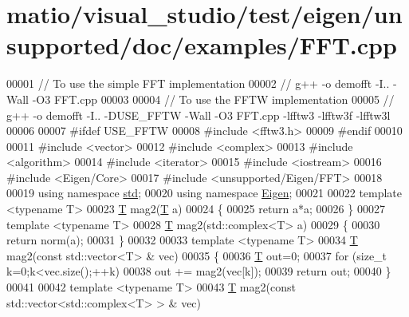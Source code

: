 \hypertarget{matio_2visual__studio_2test_2eigen_2unsupported_2doc_2examples_2_f_f_t_8cpp_source}{}\section{matio/visual\+\_\+studio/test/eigen/unsupported/doc/examples/\+F\+FT.cpp}
\label{matio_2visual__studio_2test_2eigen_2unsupported_2doc_2examples_2_f_f_t_8cpp_source}

\begin{DoxyCode}
00001 \textcolor{comment}{//  To use the simple FFT implementation}
00002 \textcolor{comment}{//  g++ -o demofft -I.. -Wall -O3 FFT.cpp }
00003 
00004 \textcolor{comment}{//  To use the FFTW implementation}
00005 \textcolor{comment}{//  g++ -o demofft -I.. -DUSE\_FFTW -Wall -O3 FFT.cpp -lfftw3 -lfftw3f -lfftw3l}
00006 
00007 \textcolor{preprocessor}{#ifdef USE\_FFTW}
00008 \textcolor{preprocessor}{#include <fftw3.h>}
00009 \textcolor{preprocessor}{#endif}
00010 
00011 \textcolor{preprocessor}{#include <vector>}
00012 \textcolor{preprocessor}{#include <complex>}
00013 \textcolor{preprocessor}{#include <algorithm>}
00014 \textcolor{preprocessor}{#include <iterator>}
00015 \textcolor{preprocessor}{#include <iostream>}
00016 \textcolor{preprocessor}{#include <Eigen/Core>}
00017 \textcolor{preprocessor}{#include <unsupported/Eigen/FFT>}
00018 
00019 \textcolor{keyword}{using namespace }\hyperlink{namespacestd}{std};
00020 \textcolor{keyword}{using namespace }\hyperlink{namespace_eigen}{Eigen};
00021 
00022 \textcolor{keyword}{template} <\textcolor{keyword}{typename} T>
00023 \hyperlink{group___sparse_core___module}{T} mag2(\hyperlink{group___sparse_core___module}{T} a)
00024 \{
00025     \textcolor{keywordflow}{return} a*a;
00026 \}
00027 \textcolor{keyword}{template} <\textcolor{keyword}{typename} T>
00028 \hyperlink{group___sparse_core___module}{T} mag2(std::complex<T> a)
00029 \{
00030     \textcolor{keywordflow}{return} norm(a);
00031 \}
00032 
00033 \textcolor{keyword}{template} <\textcolor{keyword}{typename} T>
00034 \hyperlink{group___sparse_core___module}{T} mag2(\textcolor{keyword}{const} std::vector<T> & vec)
00035 \{
00036     \hyperlink{group___sparse_core___module}{T} out=0;
00037     \textcolor{keywordflow}{for} (\textcolor{keywordtype}{size\_t} k=0;k<vec.size();++k)
00038         out += mag2(vec[k]);
00039     \textcolor{keywordflow}{return} out;
00040 \}
00041 
00042 \textcolor{keyword}{template} <\textcolor{keyword}{typename} T>
00043 \hyperlink{group___sparse_core___module}{T} mag2(\textcolor{keyword}{const} std::vector<std::complex<T> > & vec)

\end{DoxyCode}

